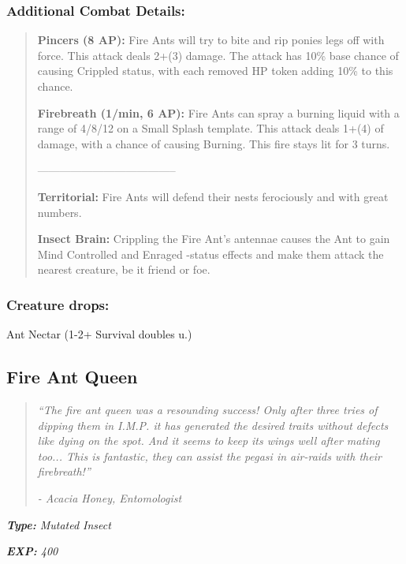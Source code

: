 \documentclass[11pt,a4paper,twocolumn]{book}
\begin{document}
	\subsubsection*{Additional Combat Details:}
	\begin{verse}
		\textbf{Pincers (8 AP):} Fire Ants will try to bite and rip ponies legs off with force. This attack deals 2+(3) damage. The attack has 10\% base chance of causing Crippled status, with each removed HP token adding 10\% to this chance.
		
		\textbf{Firebreath (1/min, 6 AP):} Fire Ants can spray a burning liquid with a range of 4/8/12 on a Small Splash template. This attack deals 1+(4) of damage, with a chance of causing Burning. This fire stays lit for 3 turns.
		
		--------------------------------------
		
		\textbf{Territorial:} Fire Ants will defend their nests ferociously and with great numbers.
		
		\textbf{Insect Brain:} Crippling the Fire Ant's antennae causes the Ant to gain Mind Controlled and Enraged -status effects and make them attack the nearest creature, be it friend or foe.
	\end{verse}
	
	\subsubsection*{Creature drops:}
	Ant Nectar (1-2+ Survival doubles u.)
	
	\vfill
	
	\subsection*{Fire Ant Queen}
	\begin{quote}
		\emph{``The fire ant queen was a resounding success! Only after three tries of dipping them in I.M.P. it has generated the desired traits without defects like dying on the spot. And it seems to keep its wings well after mating too... This is fantastic, they can assist the pegasi in air-raids with their firebreath!''}
		
		\emph{-	Acacia Honey, Entomologist}
	\end{quote}
	
	\emph{\textbf{Type:} Mutated Insect}
	
	\emph{\textbf{EXP:} 400}
	
\end{document}
